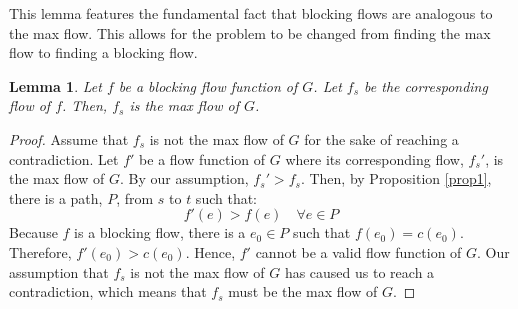\documentclass{report}
\newtheorem{lemma}{Lemma}[section]
\begin{document}
This lemma features the fundamental fact that blocking flows are analogous to the max flow. This allows for the problem to be changed from finding the max flow to finding a blocking flow.
\begin{lemma}
    Let $f$ be a blocking flow function of $G$. Let $f_s$ be the corresponding flow of $f$. Then, $f_s$ is the max flow of $G$.
\end{lemma}
\begin{proof}
    Assume that $f_s$ is not the max flow of $G$ for the sake of reaching a contradiction. Let $f'$ be a flow function of $G$ where its corresponding flow, $f_s'$, is the max flow of $G$. By our assumption, $f_s' > f_s$. Then, by Proposition \ref{prop1}, there is a path, $P$, from $s$ to $t$ such that:
    $$f'(e) > f(e) \quad \forall e \in P$$
    Because $f$ is a blocking flow, there is a $e_0 \in P$ such that $f(e_0) = c(e_0)$. Therefore, $f'(e_0) > c(e_0)$. Hence, $f'$ cannot be a valid flow function of $G$. Our assumption that $f_s$ is not the max flow of $G$ has caused us to reach a contradiction, which means that $f_s$ must be the max flow of $G$.
\end{proof}
\end{document}
